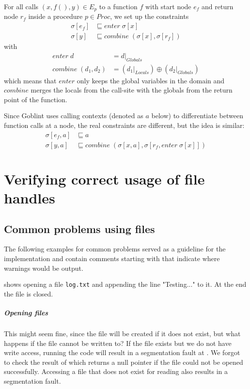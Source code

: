 For all calls $(x,f(),y) \in E_p$ to a function $f$ with start node $e_f$ and return node $r_f$ inside a procedure $p \in Proc$, we set up the constraints
\begin{align}
\sigma[e_f] &\sqsubseteq enter \; \sigma[x]\\
\sigma[y] 	&\sqsubseteq combine \; (\sigma[x], \sigma[r_f])
\end{align}
with
\begin{align}
enter \; d &= d|_{Globals}\\
combine \; (d_1, d_2) &= (d_1|_{Locals}) \oplus (d_2|_{Globals})
\end{align}
which means that $enter$ only keeps the global variables in the domain and $combine$ merges the locals from the call-site with the globals from the return point of the function.

Since Goblint uses calling contexts (denoted as $a$ below) to differentiate between function calls at a node, the real constraints are different, but the idea is similar:
\begin{align}
\sigma[e_f, a]	&\sqsubseteq a\\
\sigma[y, a]	&\sqsubseteq combine \; (\sigma[x, a], \sigma[r_f, enter \; \sigma[x]])
\end{align}


\chapter{Verifying correct usage of file handles}
\label{chap:file}
\section{Common problems using files}
The following examples for common problems served as a guideline for the implementation and contain comments starting with  that indicate where warnings would be output.

 shows opening a file \verb|log.txt| and appending the line "Testing..." to it. At the end the file is closed.

\paragraph*{Opening files}
This might seem fine, since the file will be created if it does not exist, but what happens if the file cannot be written to?
If the file exists but we do not have write access, running the code will result in a segmentation fault at .
We forgot to check the result of  which returns a null pointer if the file could not be opened successfully.
Accessing a file that does not exist for reading also results in a segmentation fault.

